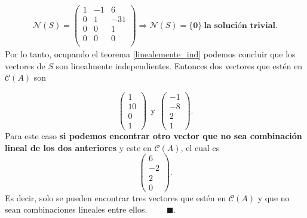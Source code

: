\documentclass[11pt,letterpaper]{article}
\newcommand{\fin}{$\blacksquare.$}
\begin{document}
\begin{enumerate}
\begin{align*}
\mathcal{N}(S)=\begin{pmatrix}
 1 & -1 &  6\\
 0 &  1 &-31\\
 0 &  0 &  1\\
 0 &  0 &  0 \\
\end{pmatrix}\Rightarrow \mathcal{N}(S)=\{ \textbf{0} \} \ \textbf{la solución trivial.}
\end{align*}
Por lo tanto, ocupando el teorema \ref{linealemente_ind} podemos concluir que los vectores de $S$ son linealmente independientes. Entonces dos vectores que estén en $\mathcal{C}(A)$ son

$$\begin{pmatrix}
1\\
10\\
0\\
1
\end{pmatrix}\ \ \text{y} \ \ \begin{pmatrix}
-1\\
-8\\
2\\
1
\end{pmatrix}.$$
Para este caso \textbf{si podemos encontrar otro vector que no sea combinación lineal de los dos anteriores} y este en $\mathcal{C}(A)$, el cual es
$$\begin{pmatrix}
6\\
-2\\
2\\
0
\end{pmatrix}.$$ 
Es decir, solo se pueden encontrar tres vectores que estén en $\mathcal{C}(A)$ y que no sean combinaciones lineales entre ellos. \ \ \ \ \fin
\end{enumerate}
\end{document}
